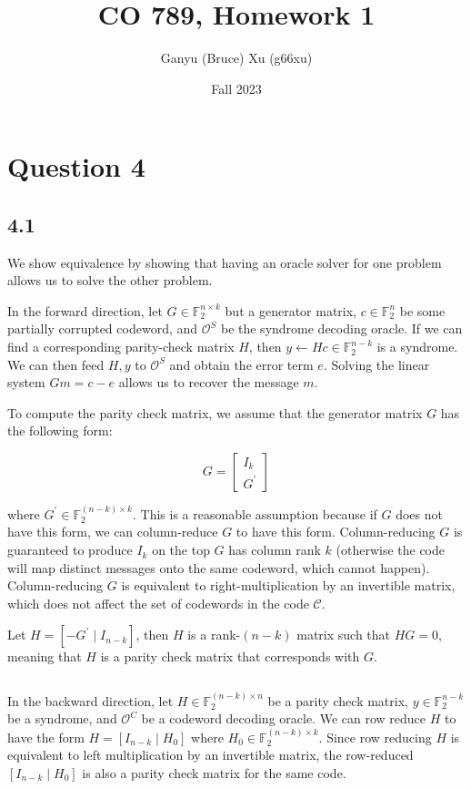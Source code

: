 \documentclass{article}
\title{CO 789, Homework 1}
\author{Ganyu (Bruce) Xu (g66xu)}
\date{Fall 2023}
\begin{document}

\section*{Question 4}

\subsection*{4.1}
We show equivalence by showing that having an oracle solver for one problem allows us to solve the other problem.

In the forward direction, let $G \in \mathbb{F}^{n \times k}_2$ but a generator matrix, $c \in \mathbb{F}^n_2$ be some partially corrupted codeword, and $\mathcal{O}^S$ be the syndrome decoding oracle. If we can find a corresponding parity-check matrix $H$, then $y \leftarrow Hc \in \mathbb{F}_2^{n-k}$ is a syndrome. We can then feed $H, y$ to $\mathcal{O}^S$ and obtain the error term $e$. Solving the linear system $Gm = c - e$ allows us to recover the message $m$.

To compute the parity check matrix, we assume that the generator matrix $G$ has the following form:

$$
G = \begin{bmatrix}
    I_k \\
    G^\prime
\end{bmatrix}
$$

where $G^\prime \in \mathbb{F}_2^{(n-k) \times k}$. This is a reasonable assumption because if $G$ does not have this form, we can column-reduce $G$ to have this form. Column-reducing $G$ is guaranteed to produce $I_k$ on the top $G$ has column rank $k$ (otherwise the code will map distinct messages onto the same codeword, which cannot happen). Column-reducing $G$ is equivalent to right-multiplication by an invertible matrix, which does not affect the set of codewords in the code $\mathcal{C}$.

Let $H = [-G^\prime \mid I_{n-k}]$, then $H$ is a rank-$(n-k)$ matrix such that $HG = 0$, meaning that $H$ is a parity check matrix that corresponds with $G$.

$$ $$

In the backward direction, let $H \in \mathbb{F}_2^{(n-k) \times n}$ be a parity check matrix, $y \in \mathbb{F}_2^{n-k}$ be a syndrome, and $\mathcal{O}^C$ be a codeword decoding oracle. We can row reduce $H$ to have the form $H = [I_{n-k} \mid H_0]$ where $H_0 \in \mathbb{F}_2^{(n-k) \times k}$. Since row reducing $H$ is equivalent to left multiplication by an invertible matrix, the row-reduced $[I_{n-k} \mid H_0]$ is also a parity check matrix for the same code.
\end{document}
